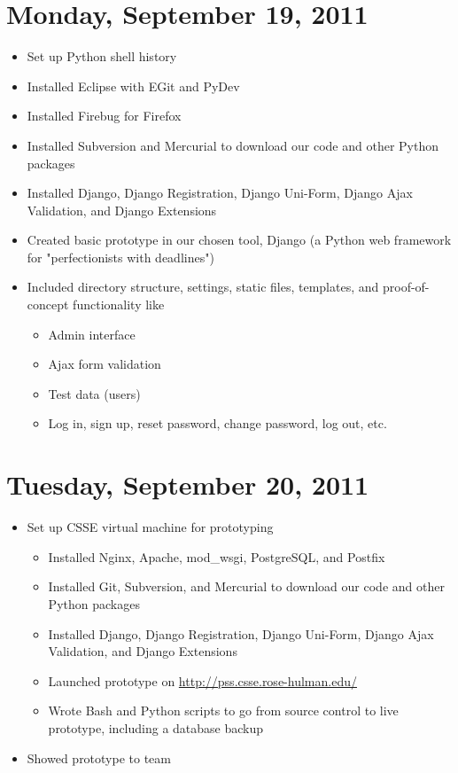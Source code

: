 \documentclass{article}
\begin{document}
\section{Monday, September 19, 2011}
\begin{itemize}
\item Set up Python shell history
\item Installed Eclipse with EGit and PyDev
\item Installed Firebug for Firefox
\item Installed Subversion and Mercurial to download our code and other Python packages
\item Installed Django, Django Registration, Django Uni-Form, Django Ajax Validation, and Django Extensions
\item Created basic prototype in our chosen tool, Django (a Python web framework for "perfectionists with deadlines")
\item Included directory structure, settings, static files, templates, and proof-of-concept functionality like
    \begin{itemize}
    \item Admin interface
    \item Ajax form validation
    \item Test data (users)
    \item Log in, sign up, reset password, change password, log out, etc.
    \end{itemize}
\end{itemize}

\section{Tuesday, September 20, 2011}
\begin{itemize}
\item Set up CSSE virtual machine for prototyping
    \begin{itemize}
    \item Installed Nginx, Apache, mod\_wsgi, PostgreSQL, and Postfix
    \item Installed Git, Subversion, and Mercurial to download our code and other Python packages
    \item Installed Django, Django Registration, Django Uni-Form, Django Ajax Validation, and Django Extensions
    \item Launched prototype on \url{http://pss.csse.rose-hulman.edu/}
    \item Wrote Bash and Python scripts to go from source control to live prototype, including a database backup
    \end{itemize}
\item Showed prototype to team
\end{itemize}
\end{document}
